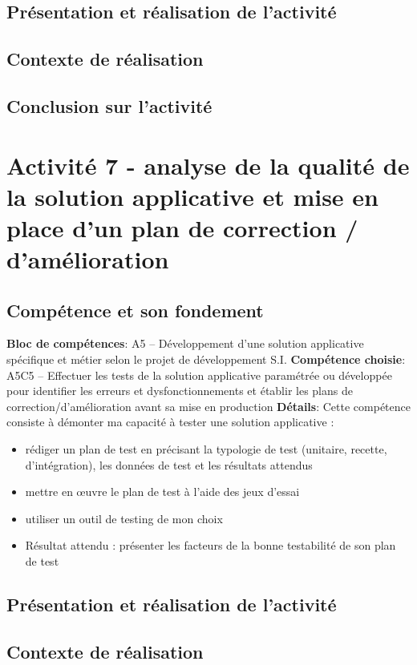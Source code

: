 \documentclass[a4paper, 11pt]{report}
\begin{document}
\subsection{Présentation et réalisation de l'activité}
\subsection{Contexte de réalisation}
\subsection{Conclusion sur l'activité}

\section{Activité 7 - analyse de la qualité de la solution applicative et mise en place d’un plan de correction / d’amélioration}
\subsection{Compétence et son fondement}
\textbf{Bloc de compétences}: A5 – Développement d’une solution applicative spécifique et métier selon le projet de développement S.I.
\newline
\textbf{Compétence choisie}: A5C5 – Effectuer les tests de la solution applicative paramétrée ou développée pour identifier les erreurs et dysfonctionnements et établir les plans de correction/d’amélioration avant sa mise en production
\newline
\textbf{Détails}: Cette compétence consiste à démonter ma capacité à tester une solution applicative :
\begin{itemize}
  \item rédiger un plan de test en précisant la typologie de test (unitaire, recette, d’intégration), les données de test et les résultats attendus
  \item mettre en œuvre le plan de test à l’aide des jeux d’essai
  \item utiliser un outil de testing de mon choix
  \item Résultat attendu : présenter les facteurs de la bonne testabilité de son plan de test
\end{itemize}
\subsection{Présentation et réalisation de l'activité}
\subsection{Contexte de réalisation}
\end{document}
